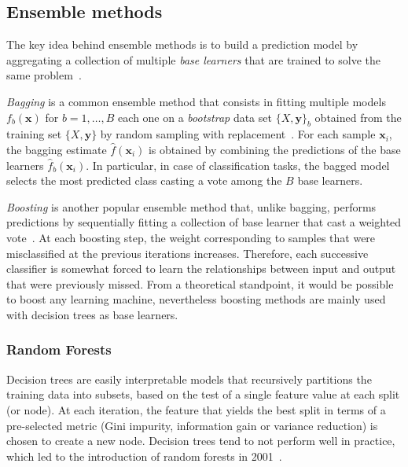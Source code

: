 	    \subsection{Ensemble methods}
	    The key idea behind ensemble methods is to build a prediction model by aggregating a collection of multiple \textit{base learners} that are trained to solve the same problem~\citep{zhou2012ensemble}.

	    \textit{Bagging} is a common ensemble method that consists in fitting multiple models $f_b(\bm{x})$ for $b=1,\dots,B$ each one on a \textit{bootstrap} data set $\{X,\bm{y}\}_b$ obtained from the training set $\{X,\bm{y}\}$ by random sampling with replacement~\citep{hastie2009elements}. For each sample $\bm{x}_i$, the bagging estimate $\hat{f}(\bm{x}_i)$ is obtained by combining the predictions of the base learners $\hat{f}_b(\bm{x}_i)$. In particular, in case of classification tasks, the bagged model selects the most predicted class casting a vote among the $B$ base learners.

	    \textit{Boosting} is another popular ensemble method that, unlike bagging, performs predictions by sequentially fitting a collection of base learner that cast a weighted vote~\citep{hastie2009elements}. At each boosting step, the weight corresponding to samples that were misclassified at the previous iterations increases. Therefore, each successive classifier is somewhat forced to learn the relationships between input and output that were previously missed. From a theoretical standpoint, it would be possible to boost any learning machine, nevertheless boosting methods are mainly used with decision trees as base learners.


	    \subsubsection{Random Forests}
	    Decision trees are easily interpretable models that recursively partitions the training data into subsets, based on the test of a single feature value at each split (or node). At each iteration, the feature that yields the best split in terms of a pre-selected metric (Gini impurity, information gain or variance reduction) is chosen to create a new node. Decision trees tend to not perform well in practice, which led to the introduction of random forests in 2001~\cite{breiman2001random}.

